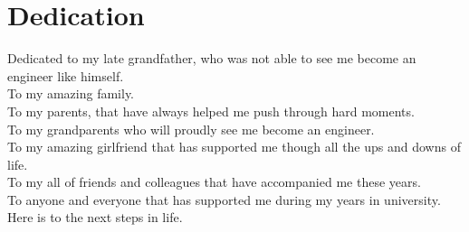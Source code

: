 \documentclass[12pt]{report} %
\begin{document}
\chapter*{Dedication}
\setcounter{page}{7}

\noindent Dedicated to my late grandfather, who was not able to see me become an engineer like himself.\\
To my amazing family.\\
To my parents, that have always helped me push through hard moments.\\
To my grandparents who will proudly see me become an engineer.\\
To my amazing girlfriend that has supported me though all the ups and downs of life.\\
To my all of friends and colleagues that have accompanied me these years.\\
To anyone and everyone that has supported me during my years in university.\\

\noindent Here is to the next steps in life.

	\vfill



\newpage %
\thispagestyle{empty}
\mbox{}




    
    
\end{document}

